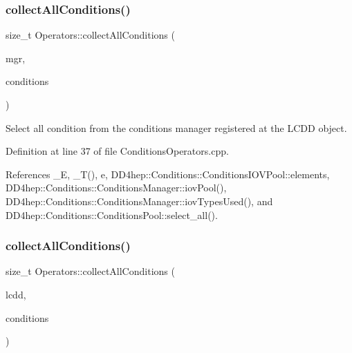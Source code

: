 \subsubsection{\texorpdfstring{collect\+All\+Conditions()}{collectAllConditions()}\hspace{0.1cm}{\footnotesize\ttfamily [2/4]}}
{\footnotesize\ttfamily size\+\_\+t Operators\+::collect\+All\+Conditions (\begin{DoxyParamCaption}\item[{\hyperlink{class_d_d4hep_1_1_conditions_1_1_conditions_manager}{Conditions\+Manager}}]{mgr,  }\item[{\hyperlink{namespace_d_d4hep_1_1_conditions_ae765f0140a33973a430280f02b6062f4}{Range\+Conditions} \&}]{conditions }\end{DoxyParamCaption})\hspace{0.3cm}{\ttfamily [static]}}



Select all condition from the conditions manager registered at the L\+C\+DD object. 



Definition at line 37 of file Conditions\+Operators.\+cpp.



References \+\_\+E, \+\_\+\+T(), e, D\+D4hep\+::\+Conditions\+::\+Conditions\+I\+O\+V\+Pool\+::elements, D\+D4hep\+::\+Conditions\+::\+Conditions\+Manager\+::iov\+Pool(), D\+D4hep\+::\+Conditions\+::\+Conditions\+Manager\+::iov\+Types\+Used(), and D\+D4hep\+::\+Conditions\+::\+Conditions\+Pool\+::select\+\_\+all().

\hypertarget{class_d_d4hep_1_1_conditions_1_1_operators_aab045322f5d5ab9c1134347704d00fad}{}\label{class_d_d4hep_1_1_conditions_1_1_operators_aab045322f5d5ab9c1134347704d00fad} 
\subsubsection{\texorpdfstring{collect\+All\+Conditions()}{collectAllConditions()}\hspace{0.1cm}{\footnotesize\ttfamily [3/4]}}
{\footnotesize\ttfamily size\+\_\+t Operators\+::collect\+All\+Conditions (\begin{DoxyParamCaption}\item[{\hyperlink{class_d_d4hep_1_1_geometry_1_1_l_c_d_d}{Geometry\+::\+L\+C\+DD} \&}]{lcdd,  }\item[{std\+::map$<$ int, \hyperlink{class_d_d4hep_1_1_conditions_1_1_condition}{Condition} $>$ \&}]{conditions }\end{DoxyParamCaption})\hspace{0.3cm}{\ttfamily [static]}}




